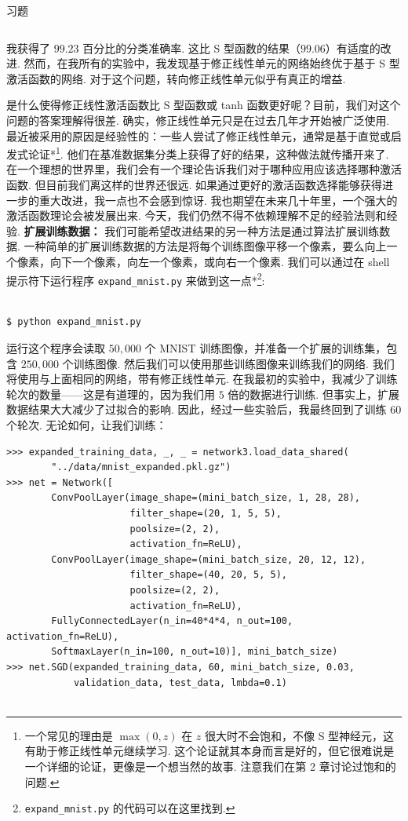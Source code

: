 \begin{exerciseBox}{习题}
\begin{lstlisting}
\end{lstlisting}

我获得了 $99.23$ 百分比的分类准确率. 这比 S 型函数的结果（$99.06$）有适度的改进. 然而，在我所有的实验中，我发现基于修正线性单元的网络始终优于基于 S 型激活函数的网络. 对于这个问题，转向修正线性单元似乎有真正的增益.

是什么使得修正线性激活函数比 S 型函数或 tanh 函数更好呢？目前，我们对这个问题的答案理解得很差. 确实，修正线性单元只是在过去几年才开始被广泛使用. 最近被采用的原因是经验性的：一些人尝试了修正线性单元，通常是基于直觉或启发式论证*\footnote{一个常见的理由是 $\max(0, z)$ 在 $z$ 很大时不会饱和，不像 S 型神经元，这有助于修正线性单元继续学习. 这个论证就其本身而言是好的，但它很难说是一个详细的论证，更像是一个想当然的故事. 注意我们在第 2 章讨论过饱和的问题.}. 他们在基准数据集分类上获得了好的结果，这种做法就传播开来了. 在一个理想的世界里，我们会有一个理论告诉我们对于哪种应用应该选择哪种激活函数. 但目前我们离这样的世界还很远. 如果通过更好的激活函数选择能够获得进一步的重大改进，我一点也不会感到惊讶. 我也期望在未来几十年里，一个强大的激活函数理论会被发展出来. 今天，我们仍然不得不依赖理解不足的经验法则和经验. \textbf{扩展训练数据：} 我们可能希望改进结果的另一种方法是通过算法扩展训练数据. 一种简单的扩展训练数据的方法是将每个训练图像平移一个像素，要么向上一个像素，向下一个像素，向左一个像素，或向右一个像素. 我们可以通过在 shell 提示符下运行程序 \texttt{expand\_\allowbreak{}mnist.py} 来做到这一点*\footnote{\texttt{expand\_\allowbreak{}mnist.py} 的代码可以在这里找到.}:

\begin{lstlisting}

$ python expand_mnist.py

\end{lstlisting}

运行这个程序会读取 $50,000$ 个 MNIST 训练图像，并准备一个扩展的训练集，包含 $250,000$ 个训练图像. 然后我们可以使用那些训练图像来训练我们的网络. 我们将使用与上面相同的网络，带有修正线性单元. 在我最初的实验中，我减少了训练轮次的数量——这是有道理的，因为我们用 $5$ 倍的数据进行训练. 但事实上，扩展数据结果大大减少了过拟合的影响. 因此，经过一些实验后，我最终回到了训练 $60$ 个轮次. 无论如何，让我们训练：

\begin{lstlisting}
>>> expanded_training_data, _, _ = network3.load_data_shared(
        "../data/mnist_expanded.pkl.gz")
>>> net = Network([
        ConvPoolLayer(image_shape=(mini_batch_size, 1, 28, 28),
                      filter_shape=(20, 1, 5, 5),
                      poolsize=(2, 2),
                      activation_fn=ReLU),
        ConvPoolLayer(image_shape=(mini_batch_size, 20, 12, 12),
                      filter_shape=(40, 20, 5, 5),
                      poolsize=(2, 2),
                      activation_fn=ReLU),
        FullyConnectedLayer(n_in=40*4*4, n_out=100, activation_fn=ReLU),
        SoftmaxLayer(n_in=100, n_out=10)], mini_batch_size)
>>> net.SGD(expanded_training_data, 60, mini_batch_size, 0.03,
            validation_data, test_data, lmbda=0.1)


\end{lstlisting}
\end{exerciseBox}
